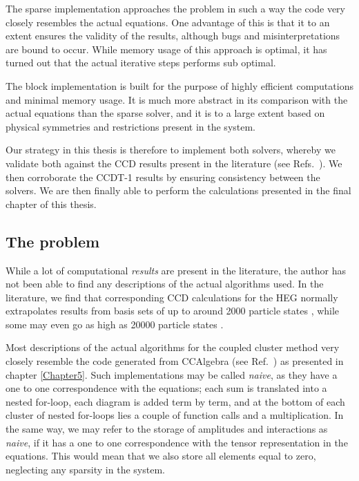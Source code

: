 The sparse implementation approaches the problem in such a way the code very closely resembles the actual equations. One advantage of this is that it to an extent ensures the validity of the results, although bugs and misinterpretations are bound to occur. While memory usage of this approach is optimal, it has turned out that the actual iterative steps performs sub optimal.

The block implementation is built for the purpose of highly efficient computations and minimal memory usage. It is much more abstract in its comparison with the actual equations than the sparse solver, and it is to a large extent based on physical symmetries and restrictions present in the system. 

Our strategy in this thesis is therefore to implement both solvers, whereby we validate both against the CCD results present in the literature (see Refs.~\cite{Baardsen2014, Roggero2013, Shepherd2012a, Shepherd2012, Shepherd2013, Shepherd2013c}). We then corroborate the CCDT-1 results by ensuring consistency between the solvers. We are then finally able to perform the calculations presented in the final chapter of this thesis.


\subsection{The problem}

While a lot of computational \emph{results} are present in the literature, the author has not been able to find any descriptions of the actual algorithms used. In the literature, we find that corresponding CCD calculations for the HEG normally extrapolates results from basis sets of up to around 2000 particle states \cite{Shepherd2014, Roggero2013}, while some may even go as high as 20000 particle states \cite{Baardsen2014}. 

Most descriptions of the actual algorithms for the coupled cluster method very closely resemble the code generated from CCAlgebra (see Ref.~\cite{CCAlgebra}) as presented in chapter \ref{Chapter5}. Such implementations may be called \emph{naive}, as they have a one to one correspondence with the equations; each sum is translated into a nested for-loop, each diagram is added term by term, and at the bottom of each cluster of nested for-loops lies a couple of function calls and a multiplication. In the same way, we may refer to the storage of amplitudes and interactions as \emph{naive}, if it has a one to one correspondence with the tensor representation in the equations. This would mean that we also store all elements equal to zero, neglecting any sparsity in the system.

